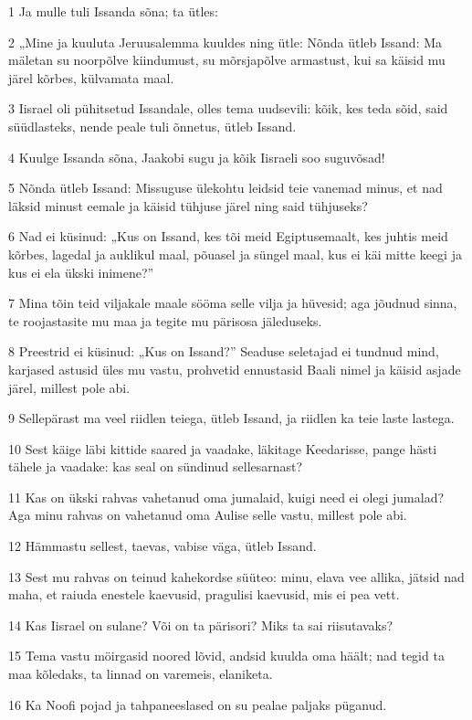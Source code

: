 \par 1 Ja mulle tuli Issanda sõna; ta ütles:
\par 2 „Mine ja kuuluta Jeruusalemma kuuldes ning ütle: Nõnda ütleb Issand: Ma mäletan su noorpõlve kiindumust, su mõrsjapõlve armastust, kui sa käisid mu järel kõrbes, külvamata maal.
\par 3 Iisrael oli pühitsetud Issandale, olles tema uudsevili: kõik, kes teda sõid, said süüdlasteks, nende peale tuli õnnetus, ütleb Issand.
\par 4 Kuulge Issanda sõna, Jaakobi sugu ja kõik Iisraeli soo suguvõsad!
\par 5 Nõnda ütleb Issand: Missuguse ülekohtu leidsid teie vanemad minus, et nad läksid minust eemale ja käisid tühjuse järel ning said tühjuseks?
\par 6 Nad ei küsinud: „Kus on Issand, kes tõi meid Egiptusemaalt, kes juhtis meid kõrbes, lagedal ja auklikul maal, põuasel ja süngel maal, kus ei käi mitte keegi ja kus ei ela ükski inimene?”
\par 7 Mina tõin teid viljakale maale sööma selle vilja ja hüvesid; aga jõudnud sinna, te roojastasite mu maa ja tegite mu pärisosa jäleduseks.
\par 8 Preestrid ei küsinud: „Kus on Issand?” Seaduse seletajad ei tundnud mind, karjased astusid üles mu vastu, prohvetid ennustasid Baali nimel ja käisid asjade järel, millest pole abi.
\par 9 Sellepärast ma veel riidlen teiega, ütleb Issand, ja riidlen ka teie laste lastega.
\par 10 Sest käige läbi kittide saared ja vaadake, läkitage Keedarisse, pange hästi tähele ja vaadake: kas seal on sündinud sellesarnast?
\par 11 Kas on ükski rahvas vahetanud oma jumalaid, kuigi need ei olegi jumalad? Aga minu rahvas on vahetanud oma Aulise selle vastu, millest pole abi.
\par 12 Hämmastu sellest, taevas, vabise väga, ütleb Issand.
\par 13 Sest mu rahvas on teinud kahekordse süüteo: minu, elava vee allika, jätsid nad maha, et raiuda enestele kaevusid, pragulisi kaevusid, mis ei pea vett.
\par 14 Kas Iisrael on sulane? Või on ta pärisori? Miks ta sai riisutavaks?
\par 15 Tema vastu möirgasid noored lõvid, andsid kuulda oma häält; nad tegid ta maa kõledaks, ta linnad on varemeis, elaniketa.
\par 16 Ka Noofi pojad ja tahpaneeslased on su pealae paljaks püganud.
